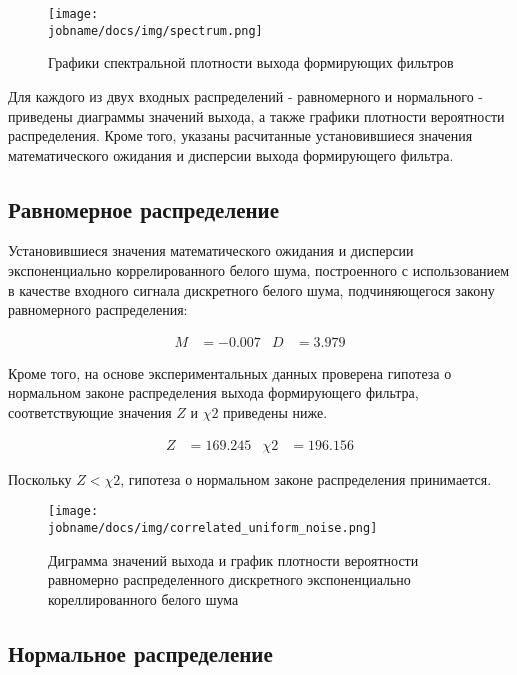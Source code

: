\begin{figure}[h!]
    \centering
    \texttt{[image: \\jobname/docs/img/spectrum.png]}
    \caption{Графики спектральной плотности выхода формирующих фильтров}
\end{figure}

Для каждого из двух входных распределений - равномерного и нормального - приведены диаграммы значений выхода,
а также графики плотности вероятности распределения.
Кроме того, указаны расчитанные установившиеся значения математического ожидания и дисперсии выхода формирующего
фильтра.

\clearpage

\subsection*{Равномерное распределение}

Установившиеся значения математического ожидания и дисперсии экспоненциально коррелированного белого шума,
построенного с использованием в качестве входного сигнала дискретного белого шума, подчиняющегося закону равномерного
распределения:

\begin{align*}
    M & = -0.007 & D & = 3.979
\end{align*}

Кроме того, на основе экспериментальных данных проверена гипотеза о нормальном законе распределения выхода формирующего
фильтра, соответствующие значения $Z$ и $\chi2$ приведены ниже.

\begin{align*}
    Z & = 169.245 & \chi2 & = 196.156
\end{align*}

Поскольку $Z < \chi2$, гипотеза о нормальном законе распределения принимается.

\begin{figure}[h!]
    \centering
    \texttt{[image: \\jobname/docs/img/correlated\_uniform\_noise.png]}
    \caption{Диграмма значений выхода и график плотности вероятности равномерно распределенного дискретного
    экспоненциально кореллированного белого шума}
\end{figure}

\clearpage

\subsection*{Нормальное распределение}

